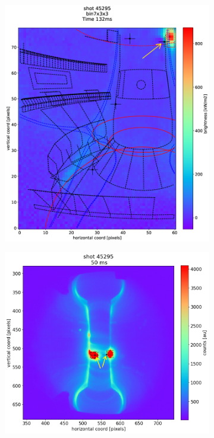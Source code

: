 \begin{figure}[!ht]
     \centering
     \begin{subfigure}{0.48\linewidth}
        \centering
        \includegraphics[width=\textwidth,trim={15 10 0 20},clip]{Chapters/chapter2/figs/IRVB-MASTU_shot-45295_export_4.png}
        \vspace*{-6mm}
        {\color{white}\caption{\phantom{ }}\label{fig:MAST-U_HFS_MID_L08_1}}
     \end{subfigure}
     \begin{subfigure}{0.48\linewidth}
        \vspace*{2mm}
        \centering
        \includegraphics[width=\textwidth,trim={55 41 0 50},clip]{Chapters/chapter2/figs/45295_for_paper3.png}

\end{subfigure}
\end{figure}

